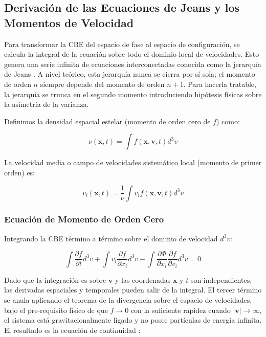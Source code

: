         \subsection{Derivación de las Ecuaciones de Jeans y los Momentos de 
        Velocidad}
            Para transformar la CBE del espacio de fase al espacio de 
            configuración, se calcula la integral de la ecuación sobre todo el 
            dominio local de velocidades. Esto genera una serie infinita de 
            ecuaciones interconectadas conocida como la jerarquía de Jeans 
            \cite{ciotti_2021_jeans}. A nivel teórico, esta jerarquía nunca se 
            cierra por sí sola; el momento de orden $n$ siempre depende del 
            momento de orden $n+1$. Para hacerla tratable, la jerarquía se 
            trunca en el segundo momento introduciendo hipótesis físicas sobre 
            la asimetría de la varianza.

            Definimos la densidad espacial estelar (momento de orden cero de 
            $f$) como:

            $$\nu(\mathbf{x}, t) = \int f(\mathbf{x}, \mathbf{v}, t) d^3v$$

            La velocidad media o campo de velocidades sistemático local 
            (momento de primer orden) es: \cite{binney_tremaine_2008}

            $$\bar{v}_i(\mathbf{x}, t) = \frac{1}{\nu} \int v_i f(\mathbf{x}, 
            \mathbf{v}, t) d^3v$$

            \subsubsection{Ecuación de Momento de Orden Cero}
                Integrando la CBE término a término sobre el dominio de 
                velocidad $d^3v$:

                $$\int \frac{\partial f}{\partial t} d^3v + \int v_i 
                \frac{\partial f}{\partial x_i} d^3v - \int \frac{\partial 
                \Phi}{\partial x_i} \frac{\partial f}{\partial v_i} d^3v = 0$$

                Dado que la integración es sobre $\mathbf{v}$ y las coordenadas 
                $\mathbf{x}$ y $t$ son independientes, las derivadas espaciales 
                y temporales pueden salir de la integral. El tercer término se 
                anula aplicando el teorema de la divergencia sobre el espacio de 
                velocidades, bajo el pre-requisito físico de que $f \to 0$ con 
                la suficiente rapidez cuando $|\mathbf{v}| \to \infty$, el 
                sistema está gravitacionalmente ligado y no posee partículas de 
                energía infinita. El resultado es la ecuación de continuidad 
                \cite{binney_tremaine_2008}:

